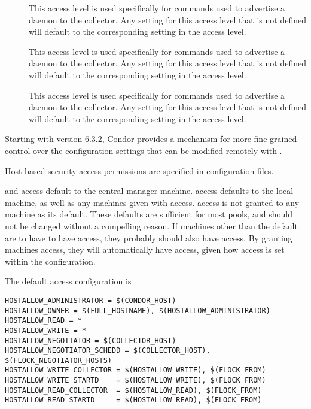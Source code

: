 \begin{description}
\item[] \label{dcperm:advertise-master} This
   access level is used specifically for commands used to advertise a
    daemon to the collector.  Any setting for this access
   level that is not defined will default to the corresponding setting
   in the  access level.

\item[] \label{dcperm:advertise-startd} This
   access level is used specifically for commands used to advertise a
    daemon to the collector.  Any setting for this access
   level that is not defined will default to the corresponding setting
   in the  access level.

\item[] \label{dcperm:advertise-schedd} This
   access level is used specifically for commands used to advertise a
    daemon to the collector.  Any setting for this access
   level that is not defined will default to the corresponding setting
   in the  access level.

\end{description}

Starting with version 6.3.2, Condor provides a mechanism for more
fine-grained control over the configuration settings that can be
modified remotely with .  

Host-based security access
permissions are specified in configuration files.

 and  access default to 
the central manager machine.
 access defaults to the local machine, as well as
any machines
given with  access.
 access is not granted to any machine
as its default.
These defaults are sufficient for most pools, and should not be changed without
a compelling reason.
If machines other than the default are to have to have 
access, they probably should also have  access.
By granting machines  access, they
will automatically have  access, given how
 access is set within the configuration.

The default access configuration is
\footnotesize
\begin{verbatim}
HOSTALLOW_ADMINISTRATOR = $(CONDOR_HOST)
HOSTALLOW_OWNER = $(FULL_HOSTNAME), $(HOSTALLOW_ADMINISTRATOR)
HOSTALLOW_READ = *
HOSTALLOW_WRITE = *
HOSTALLOW_NEGOTIATOR = $(COLLECTOR_HOST)
HOSTALLOW_NEGOTIATOR_SCHEDD = $(COLLECTOR_HOST), $(FLOCK_NEGOTIATOR_HOSTS)
HOSTALLOW_WRITE_COLLECTOR = $(HOSTALLOW_WRITE), $(FLOCK_FROM)
HOSTALLOW_WRITE_STARTD    = $(HOSTALLOW_WRITE), $(FLOCK_FROM)
HOSTALLOW_READ_COLLECTOR  = $(HOSTALLOW_READ), $(FLOCK_FROM)
HOSTALLOW_READ_STARTD     = $(HOSTALLOW_READ), $(FLOCK_FROM)
\end{verbatim}
\normalsize

